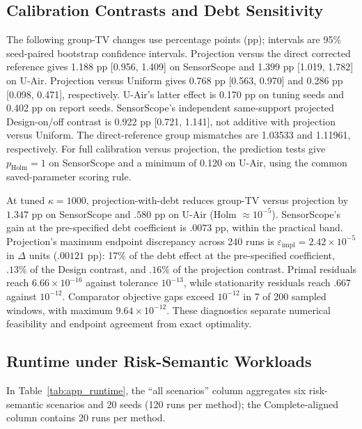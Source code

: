 \subsection{Calibration Contrasts and Debt Sensitivity}


The following group-TV changes use percentage points (pp); intervals are
95\% seed-paired bootstrap confidence intervals. Projection versus the direct
corrected reference gives 1.188 pp [0.956, 1.409] on SensorScope and
1.399 pp [1.019, 1.782] on U-Air. Projection versus Uniform gives
0.768 pp [0.563, 0.970] and 0.286 pp [0.098, 0.471], respectively.
U-Air's latter effect is 0.170 pp on tuning seeds and 0.402 pp on report seeds.
SensorScope's independent same-support projected Design-on/off contrast is
0.922 pp [0.721, 1.141], not additive with projection versus Uniform.
The direct-reference group mismatches are 1.03533 and 1.11961, respectively.
For full calibration versus projection, the prediction tests give
$p_{\mathrm{Holm}}=1$ on SensorScope and a minimum of 0.120 on U-Air,
using the common saved-parameter scoring rule.


At tuned $\kappa=1000$, projection-with-debt reduces group-TV versus projection
by $1.347$ pp on SensorScope and $.580$ pp on U-Air (Holm $\approx10^{-5}$).
SensorScope's gain at the pre-specified debt coefficient is $.0073$ pp,
within the practical band.
Projection's maximum endpoint discrepancy across 240 runs is
$\varepsilon_{\mathrm{impl}}=2.42\times10^{-5}$ in $\Delta$ units ($.00121$ pp):
17\% of the debt effect at the pre-specified coefficient, $.13\%$ of the
Design contrast, and $.16\%$ of the projection contrast. Primal residuals reach $6.66\times10^{-16}$ against tolerance
$10^{-13}$, while stationarity residuals reach $.667$ against $10^{-12}$.
Comparator objective gaps exceed $10^{-12}$ in 7 of 200 sampled windows,
with maximum $9.64\times10^{-12}$. These diagnostics separate numerical
feasibility and endpoint agreement from exact optimality.



\subsection{Runtime under Risk-Semantic Workloads}

In Table~\ref{tab:app_runtime}, the ``all scenarios'' column aggregates six
risk-semantic scenarios and 20 seeds (120 runs per method); the Complete-aligned column
contains 20 runs per method.

